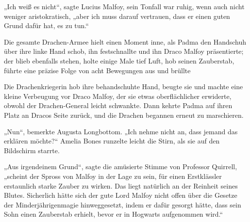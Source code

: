 „Ich weiß es nicht“, sagte Lucius Malfoy, sein Tonfall war ruhig, wenn auch nicht weniger aristokratisch, „aber ich muss darauf vertrauen, dass er einen guten Grund dafür hat, es zu tun.“

Die gesamte Drachen-Armee hielt einen Moment inne, als Padma den Handschuh über ihre linke Hand schob, ihn festschnallte und ihn Draco Malfoy präsentierte; der blieb ebenfalls stehen, holte einige Male tief Luft, hob seinen Zauberstab, führte eine präzise Folge von acht Bewegungen aus und brüllte 

Die Drachenkriegerin hob ihre behandschuhte Hand, beugte sie und machte eine kleine Verbeugung vor Draco Malfoy, der sie etwas oberflächlicher erwiderte, obwohl der Drachen-General leicht schwankte. Dann kehrte Padma auf ihren Platz an Dracos Seite zurück, und die Drachen begannen erneut zu marschieren.

„Nun“, bemerkte Augusta Longbottom. „Ich nehme nicht an, dass jemand das erklären möchte?“ Amelia Bones runzelte leicht die Stirn, als sie auf den Bildschirm starrte.

„Aus irgendeinem Grund“, sagte die amüsierte Stimme von Professor Quirrell, „scheint der Spross von Malfoy in der Lage zu sein, für einen Erstklässler erstaunlich starke Zauber zu wirken. Das liegt natürlich an der Reinheit seines Blutes. Sicherlich hätte sich der gute Lord Malfoy nicht offen über die Gesetze der Minderjährigenmagie hinweggesetzt, indem er dafür gesorgt hätte, dass sein Sohn einen Zauberstab erhielt, bevor er in Hogwarts aufgenommen wird.“

